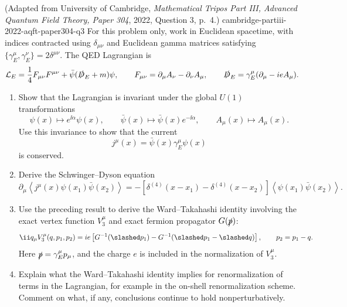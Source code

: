 \begin{enumerate}
  {(Adapted from University of Cambridge, \emph{Mathematical Tripos Part III, Advanced Quantum Field Theory, Paper 304}, 2022, Question 3, p.~4.)}
  {cambridge-partiii-2022-aqft-paper304-q3}
For this problem only, work in Euclidean spacetime, with indices contracted
using \(\delta_{\mu\nu}\) and Euclidean gamma matrices satisfying
\(\{\gamma_E^\mu,\gamma_E^\nu\}=2\delta^{\mu\nu}\).  The QED Lagrangian is
\[
 \mathcal L_E=\frac14F_{\mu\nu}F^{\mu\nu}
 +\bar\psi(\slashed D_E+m)\psi,
 \qquad
 F_{\mu\nu}=\partial_\mu A_\nu-\partial_\nu A_\mu,
 \qquad
 \slashed D_E=\gamma_E^\mu(\partial_\mu-ieA_\mu).
\]
\begin{enumerate}
\item
Show that the Lagrangian is invariant under the global \(U(1)\)
transformations
\[
 \psi(x)\longmapsto e^{\ii\alpha}\psi(x),\qquad
 \bar\psi(x)\longmapsto\bar\psi(x)e^{-\ii\alpha},\qquad
 A_\mu(x)\longmapsto A_\mu(x).
\]
Use this invariance to show that the current
\[
 j^\mu(x)=\bar\psi(x)\gamma_E^\mu\psi(x)
\]
is conserved.
\item
Derive the Schwinger--Dyson equation
\[
 \partial_\mu
 \left\langle j^\mu(x)\psi(x_1)\bar\psi(x_2)\right\rangle
 =-\left[\delta^{(4)}(x-x_1)-\delta^{(4)}(x-x_2)\right]
 \left\langle\psi(x_1)\bar\psi(x_2)\right\rangle.
\]
\item
Use the preceding result to derive the Ward--Takahashi identity involving
the exact vertex function \(V_3^\mu\) and exact fermion propagator
\(G(\slashed p)\):
\[
 \ii q_\mu V_3^\mu(q,p_1,p_2)
 =ie\left[G^{-1}(\slashed p_1)
 -G^{-1}(\slashed p_1-\slashed q)\right],
 \qquad p_2=p_1-q.
\]
Here \(\slashed p=\gamma_E^\mu p_\mu\), and the charge \(e\) is included
in the normalization of \(V_3^\mu\).
\item
Explain what the Ward--Takahashi identity implies for renormalization of
terms in the Lagrangian, for example in the on-shell renormalization
scheme.  Comment on what, if any, conclusions continue to hold
nonperturbatively.
\end{enumerate}


\end{enumerate}
